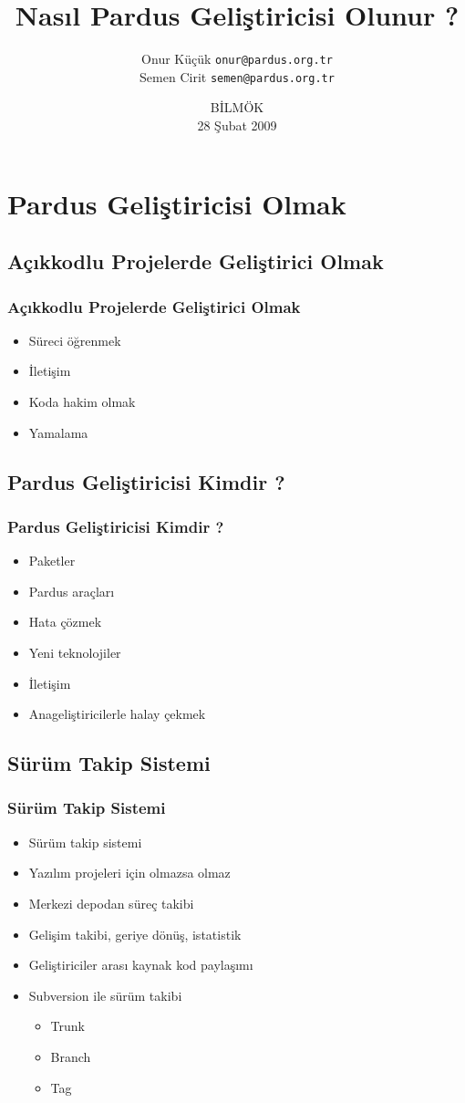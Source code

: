 \documentclass{beamer}
\title{Nasıl Pardus Geliştiricisi Olunur ?}
\author[Onur Küçük \& Semen Cirit]{Onur Küçük \texttt{onur@pardus.org.tr}\\
        Semen Cirit \texttt{semen@pardus.org.tr}}
\date{BİLMÖK\\ 28 Şubat 2009}
\institute{
  Ulusal Elektronik ve Kriptoloji Araştırma Enstitüsü\\
  TÜBİTAK}
\begin{document}
\frame{\titlepage}

\section{Pardus Geliştiricisi Olmak}

\subsection{Açıkkodlu Projelerde Geliştirici Olmak}
\frame
{
    \frametitle{Açıkkodlu Projelerde Geliştirici Olmak}
    \begin{itemize}
        \item Süreci öğrenmek
        \item İletişim
        \item Koda hakim olmak
        \item Yamalama
    \end{itemize}
}

\subsection{Pardus Geliştiricisi Kimdir ?}
\frame
{
    \frametitle{Pardus Geliştiricisi Kimdir ?}
    \begin{itemize}
        \item Paketler
        \item Pardus araçları
        \item Hata çözmek
        \item Yeni teknolojiler
        \item İletişim
        \item Anageliştiricilerle halay çekmek
    \end{itemize}
}

\subsection{Sürüm Takip Sistemi}
\frame
{
    \frametitle{Sürüm Takip Sistemi}
    \begin{itemize}
        \item Sürüm takip sistemi
        \item Yazılım projeleri için olmazsa olmaz
        \item Merkezi depodan süreç takibi
        \item Gelişim takibi, geriye dönüş, istatistik
        \item Geliştiriciler arası kaynak kod paylaşımı
        \item Subversion ile sürüm takibi
            \begin{itemize}
                \item Trunk
                \item Branch
                \item Tag
            \end{itemize}
    \end{itemize}
}
\end{document}

